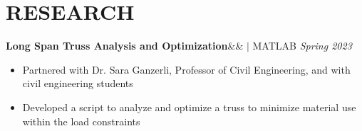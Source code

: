 \documentclass[11pt, a4paper, roman]{moderncv}
\newcommand{\project}[5]{
	\textbf{#1}\ifx&#2&{}
	\else
    		\href{#2}{\:\small\faGithub\:}\fi$|$ #3
	\hfill\textit{#4}
	#5
	\vspace{2mm}
}
\begin{document}





\vspace*{-2mm}
\section{RESEARCH}
{\project{Long Span Truss Analysis and Optimization}{}{MATLAB}{Spring 2023}
	{\begin{itemize}
		\item Partnered with Dr. Sara Ganzerli, Professor of Civil Engineering, and  with civil engineering students
		\item Developed a script to analyze and optimize a truss to minimize material use within the load constraints
	\end{itemize}}
}
\end{document}
